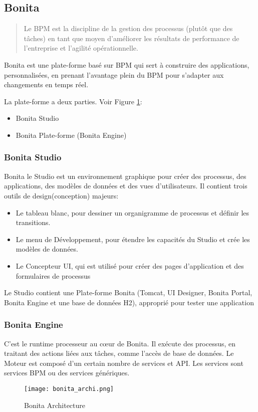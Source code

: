\subsection{Bonita}
\begin{quotation}
Le BPM est la discipline de la gestion des processus (plutôt que des tâches) en tant que moyen d'améliorer les résultats de performance de l'entreprise et l'agilité opérationnelle. \cite{gartnerdic}
\end{quotation}

Bonita est une plate-forme basé sur BPM qui sert à construire des applications, personnalisées, en prenant l'avantage plein du BPM pour s'adapter aux changements en temps réel.

La plate-forme a deux parties. Voir Figure \ref{fig:bonita_archi}:
\begin{itemize}
  \item Bonita Studio
  \item Bonita Plate-forme (Bonita Engine)
\end{itemize}

\subsubsection{Bonita Studio}
Bonita le Studio est un environnement graphique pour créer des processus, des applications, des modèles de données et des vues d'utilisateurs. Il contient trois outils de design(conception) majeurs:

\begin{itemize}
  \item Le tableau blanc, pour dessiner un organigramme de processus et définir les transitions.
  \item Le menu de Développement, pour étendre les capacités du Studio et crée les modèles de données.
  \item Le Concepteur UI, qui est utilisé pour créer des pages d'application et des formulaires de processus
\end{itemize}

Le Studio contient une Plate-forme Bonita (Tomcat, UI Designer, Bonita Portal, Bonita Engine et une base de données H2), approprié pour tester une application

\subsubsection{Bonita Engine}
C'est le runtime processeur au cœur de Bonita. Il exécute des processus, en traitant des actions liées aux tâches, comme l'accès de base de données. Le Moteur est composé d'un certain nombre de services et API. Les services sont services BPM ou des services génériques.

\begin{figure}[!ht]
\centering
\texttt{[image: bonita\_archi.png]}
\caption{Bonita Architecture}
\label{fig:bonita_archi}
\end{figure}
